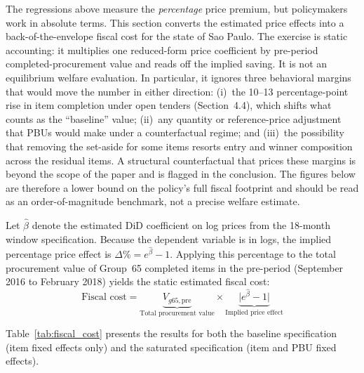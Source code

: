 The regressions above measure the \emph{percentage} price premium, but policymakers work in absolute terms. This section converts the estimated price effects into a back-of-the-envelope fiscal cost for the state of Sao Paulo. The exercise is static accounting: it multiplies one reduced-form price coefficient by pre-period completed-procurement value and reads off the implied saving. It is not an equilibrium welfare evaluation. In particular, it ignores three behavioral margins that would move the number in either direction: (i)~the 10--13 percentage-point rise in item completion under open tenders (Section~4.4), which shifts what counts as the ``baseline'' value; (ii)~any quantity or reference-price adjustment that PBUs would make under a counterfactual regime; and (iii)~the possibility that removing the set-aside for some items resorts entry and winner composition across the residual items. A structural counterfactual that prices these margins is beyond the scope of the paper and is flagged in the conclusion. The figures below are therefore a lower bound on the policy's full fiscal footprint and should be read as an order-of-magnitude benchmark, not a precise welfare estimate.

Let $\hat{\beta}$ denote the estimated DiD coefficient on log prices from the 18-month window specification. Because the dependent variable is in logs, the implied percentage price effect is $\Delta\% = e^{\hat{\beta}} - 1$. Applying this percentage to the total procurement value of Group~65 completed items in the pre-period (September 2016 to February 2018) yields the static estimated fiscal cost:
\begin{equation}
\text{Fiscal cost} = \underbrace{V_{g65,\text{pre}}}_{\text{Total procurement value}} \times \underbrace{\bigl|e^{\hat{\beta}} - 1\bigr|}_{\text{Implied price effect}}
\end{equation}

Table~\ref{tab:fiscal_cost} presents the results for both the baseline specification (item fixed effects only) and the saturated specification (item and PBU fixed effects).

